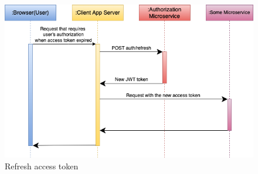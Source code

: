 \begin{figure}[hp]
\centering
\includegraphics[scale=0.6]{../png/refresh_token.png}
\caption{Refresh access token}
\end{figure}
